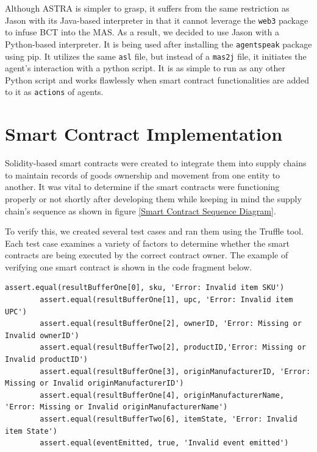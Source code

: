\vspace{.5cm}

Although ASTRA is simpler to grasp, it suffers from the same restriction as Jason with its Java-based interpreter in that it cannot leverage the \texttt{web3} package to infuse \ac{BCT} into the \ac{MAS}. As a result, we decided to use Jason with a Python-based interpreter. It is being used after installing the \texttt{agentspeak} package using \ac{pip}. It utilizes the same \texttt{asl} file, but instead of a \texttt{mas2j} file, it initiates the agent's interaction with a python script. It is as simple to run as any other Python script and works flawlessly when smart contract functionalities are added to it as \texttt{actions} of agents.

\section{Smart Contract Implementation }

Solidity-based smart contracts were created to integrate them into supply chains to maintain records of goods ownership and movement from one entity to another. It was vital to determine if the smart contracts were functioning properly or not shortly after developing them while keeping in mind the supply chain's sequence as shown in figure \ref{Smart Contract Sequence Diagram}. 

\vspace{.5cm}

To verify this, we created several test cases and ran them using the Truffle tool. Each test case examines a variety of factors to determine whether the smart contracts are being executed by the correct contract owner. The example of verifying one smart contract is shown in the code fragment below.

\vspace{.5cm}
\begin{lstlisting}[backgroundcolor = \color{white}, numbers=none, basicstyle=\ttfamily\tiny]
        assert.equal(resultBufferOne[0], sku, 'Error: Invalid item SKU')
        assert.equal(resultBufferOne[1], upc, 'Error: Invalid item UPC')
        assert.equal(resultBufferOne[2], ownerID, 'Error: Missing or Invalid ownerID')
        assert.equal(resultBufferTwo[2], productID,'Error: Missing or Invalid productID')
        assert.equal(resultBufferOne[3], originManufacturerID, 'Error: Missing or Invalid originManufacturerID')
        assert.equal(resultBufferOne[4], originManufacturerName, 'Error: Missing or Invalid originManufacturerName')
        assert.equal(resultBufferTwo[6], itemState, 'Error: Invalid item State')
        assert.equal(eventEmitted, true, 'Invalid event emitted')
\end{lstlisting}

